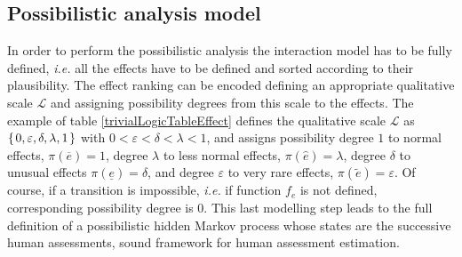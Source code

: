 \subsection{Possibilistic analysis model}
\label{subsec:possibilisticModel}
In order to perform the possibilistic analysis 
the interaction model has to be fully defined, 
\textit{i.e.} all the effects 
have to be defined and sorted according to their plausibility. 
The effect ranking can be encoded defining an appropriate qualitative 
scale $\mathcal{L}$ and assigning possibility degrees from
this scale to the effects. 
The example of table \ref{trivialLogicTableEffect}
defines the qualitative scale $\mathcal{L}$ as 
$\left\{ \left.  0, \varepsilon, \delta, \lambda, 1  \right. \right\}$
with $0 < \varepsilon < \delta < \lambda < 1 $, 
and assigns possibility degree $1$ to normal effects, 
$\pi(\overline{e})=1$, 
degree $\lambda$ to less normal effects, 
$\pi(\widehat{e}) = \lambda$, 
degree $\delta$ to unusual effects 
$\pi(\underline{e})=\delta$, 
and degree $\varepsilon$ to very rare effects, 
$\pi(\tilde{e})=\varepsilon$.
Of course, if a transition is impossible, \textit{i.e.} if function $f_e$ is not defined,
corresponding possibility degree is $0$. 
This last modelling step leads to the full definition 
of a possibilistic hidden Markov process whose states
are the successive human assessments, sound framework for human assessment estimation.

